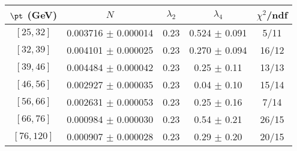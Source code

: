 \begin{tabular}{c||c|c|c|c}
$\pt$ (GeV) & $N$ & $\lambda_{2}$ & $\lambda_4$  & $\chi^2$/ndf  \\
\hline
$[25, 32]$ & 0.003716 $\pm$ 0.000014 & 0.23 & 0.524 $\pm$ 0.091 & 5/11\\
$[32, 39]$ & 0.004101 $\pm$ 0.000025 & 0.23 & 0.270 $\pm$ 0.094 & 16/12\\
$[39, 46]$ & 0.004484 $\pm$ 0.000042 & 0.23 & 0.25 $\pm$ 0.11 & 13/13\\
$[46, 56]$ & 0.002927 $\pm$ 0.000035 & 0.23 & 0.04 $\pm$ 0.10 & 15/14\\
$[56, 66]$ & 0.002631 $\pm$ 0.000053 & 0.23 & 0.25 $\pm$ 0.16 & 7/14\\
$[66, 76]$ & 0.000984 $\pm$ 0.000030 & 0.23 & 0.54 $\pm$ 0.21 & 26/15\\
$[76, 120]$ & 0.000907 $\pm$ 0.000028 & 0.23 & 0.29 $\pm$ 0.20 & 20/15\\
\end{tabular}
